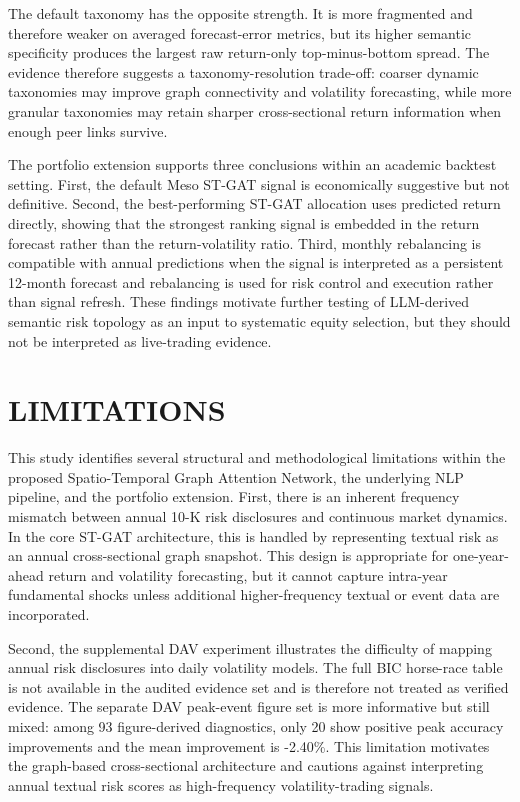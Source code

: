 \documentclass[11pt, a4paper]{article}
\begin{document}
The default taxonomy has the opposite strength. It is more fragmented and therefore weaker on averaged forecast-error metrics, but its higher semantic specificity produces the largest raw return-only top-minus-bottom spread. The evidence therefore suggests a taxonomy-resolution trade-off: coarser dynamic taxonomies may improve graph connectivity and volatility forecasting, while more granular taxonomies may retain sharper cross-sectional return information when enough peer links survive.

The portfolio extension supports three conclusions within an academic backtest setting. First, the default Meso ST-GAT signal is economically suggestive but not definitive. Second, the best-performing ST-GAT allocation uses predicted return directly, showing that the strongest ranking signal is embedded in the return forecast rather than the return-volatility ratio. Third, monthly rebalancing is compatible with annual predictions when the signal is interpreted as a persistent 12-month forecast and rebalancing is used for risk control and execution rather than signal refresh. These findings motivate further testing of LLM-derived semantic risk topology as an input to systematic equity selection, but they should not be interpreted as live-trading evidence.

\section{LIMITATIONS}

This study identifies several structural and methodological limitations within the proposed Spatio-Temporal Graph Attention Network, the underlying NLP pipeline, and the portfolio extension. First, there is an inherent frequency mismatch between annual 10-K risk disclosures and continuous market dynamics. In the core ST-GAT architecture, this is handled by representing textual risk as an annual cross-sectional graph snapshot. This design is appropriate for one-year-ahead return and volatility forecasting, but it cannot capture intra-year fundamental shocks unless additional higher-frequency textual or event data are incorporated.

Second, the supplemental DAV experiment illustrates the difficulty of mapping annual risk disclosures into daily volatility models. The full BIC horse-race table is not available in the audited evidence set and is therefore not treated as verified evidence. The separate DAV peak-event figure set is more informative but still mixed: among 93 figure-derived diagnostics, only 20 show positive peak accuracy improvements and the mean improvement is -2.40\%. This limitation motivates the graph-based cross-sectional architecture and cautions against interpreting annual textual risk scores as high-frequency volatility-trading signals.
\end{document}
